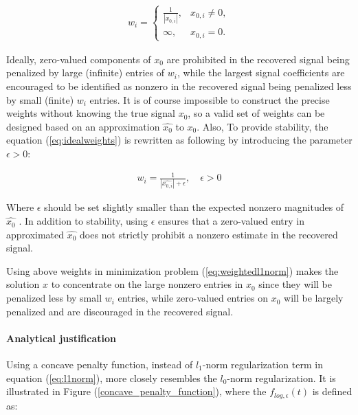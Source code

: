\begin{equation}
\label{eq:idealweights}
\begin{gathered}
w_{i} = \left\{\begin{matrix}
\frac{1}{\left | x_{0,i} \right |} , & x_{0,i} \neq 0 , \\
\infty , &  x_{0,i} = 0.
\end{matrix}\right.
\end{gathered}
\end{equation}

Ideally, zero-valued components of $x_{0}$ are prohibited in the recovered signal being penalized by large (infinite) entries of $w_{i}$, while the largest signal coefficients are encouraged to be identified as nonzero in the recovered signal being penalized less by small (finite) $w_{i}$ entries. It is of course impossible to construct the precise weights without knowing the true signal $x_{0}$, so a valid set of weights can be designed based on an approximation $\hat{x_{0}}$ to $x_{0}$. Also, To provide stability, the equation (\ref{eq:idealweights}) is rewritten as following by introducing the parameter $\epsilon > 0$:

\begin{equation}
\label{eq:weights}
\begin{gathered}
w_{i} = \frac{1}{\left | \hat{x_{0,i}} \right | + \epsilon } , \quad \epsilon > 0
\end{gathered}
\end{equation}

Where $\epsilon$ should be set slightly smaller than the expected nonzero magnitudes of $\hat{x_{0}}$ \cite{candes2008enhancing}. In addition to stability, using $\epsilon$ ensures that a zero-valued entry in approximated $\hat{x_{0}}$ does not strictly prohibit a nonzero estimate in the recovered signal.

Using above weights in minimization problem (\ref{eq:weightedl1norm}) makes the solution $x$ to concentrate on the large nonzero entries in $x_{0}$ since they will be penalized less by small $w_{i}$ entries, while zero-valued entries on $x_{0}$ will be largely penalized and are discouraged in the recovered signal.

\paragraph{Analytical justification} %
\label{subsubsection:analyticalJustification}

Using a concave penalty function, instead of $l_1$-norm regularization term in equation (\ref{eq:l1norm}), more closely resembles the $l_0$-norm regularization. It is illustrated in Figure (\ref{concave_penalty_function}), where the $f_{log,\epsilon}(t)$ is defined as:


